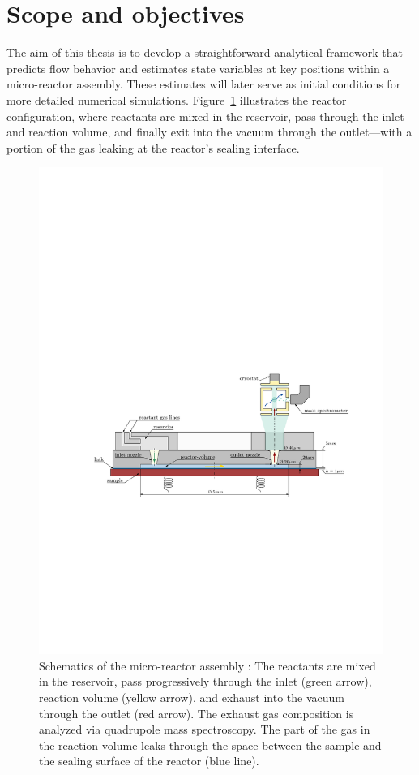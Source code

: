 \section{Scope and objectives}\label{sec:scope-objectives}
	The aim of this thesis is to develop a straightforward analytical framework that predicts flow behavior and estimates state variables at key positions within a micro-reactor assembly.
	These estimates will later serve as initial conditions for more detailed numerical simulations.
	Figure \ref{fig:technical-drawing} illustrates the reactor configuration, where reactants are mixed in the reservoir, pass through the inlet and reaction volume, and finally exit into the vacuum through the outlet—with a portion of the gas leaking at the reactor’s sealing interface.
	\begin{figure}[H]
	    \centering
	    \includegraphics[width=\textwidth]{src/01_scope-and-objectives/fig_technical-drawing.pdf}
	    \caption{Schematics of the micro-reactor assembly \cite{lagin2025poster}: The reactants are mixed in the reservoir, pass progressively through the inlet (green arrow), reaction volume (yellow arrow), and exhaust into the vacuum through the outlet (red arrow). The exhaust gas composition is analyzed via quadrupole mass spectroscopy. The part of the gas in the reaction volume leaks through the space between the sample and the sealing surface of the reactor (blue line).}
	    \label{fig:technical-drawing}
	\end{figure}
